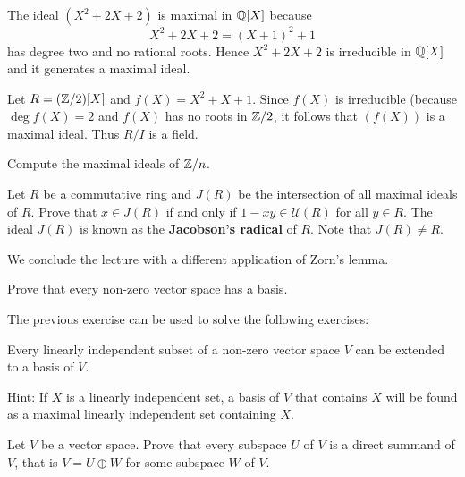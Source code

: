 \begin{example}
	The ideal $(X^2+2X+2)$ is maximal in $\mathbb{Q}[X]$ because
	\[
	X^2+2X+2=(X+1)^2+1
	\]
	has degree two and no rational roots. 
	Hence $X^2+2X+2$ is irreducible in $\mathbb{Q}[X]$ and it generates 
	a maximal ideal. 	
\end{example}


\begin{example}
	Let $R=(\mathbb{Z}/2)[X]$ and $f(X)=X^2+X+1$. Since $f(X)$ is irreducible (because $\deg f(X)=2$ and
	$f(X)$ has no roots in $\mathbb{Z}/2$, it follows that $(f(X))$ is a maximal ideal. 
	Thus $R/I$ is a field. 
\end{example}

\begin{exercise}
	Compute the maximal ideals of $\mathbb{Z}/n$. 	
\end{exercise}

\begin{exercise}
\label{xca:Jacobson}
	Let $R$ be a commutative ring and $J(R)$ be the intersection of all maximal ideals 
	of $R$. Prove that $x\in J(R)$ 
	if and only if $1-xy\in\mathcal{U}(R)$ for all $y\in R$. The ideal $J(R)$ is known
	as the \textbf{Jacobson's radical} of $R$. Note that $J(R)\ne R$.   
\end{exercise}

We conclude the lecture with a different application of Zorn's lemma.  

\begin{exercise}
	Prove that every non-zero vector space has a basis.
\end{exercise}

The previous exercise can be used to solve the following exercises:

\begin{exercise}
\label{xca:extend}
    Every linearly independent subset of a non-zero vector space
    $V$ can be extended to a basis of $V$.
\end{exercise} 

Hint: If $X$ is a linearly independent set, a basis 
of $V$ that contains $X$ will be found as a maximal linearly independent set 
containing $X$. 

\begin{exercise}
    Let $V$ be a vector space. Prove that every subspace $U$ of $V$ is a direct summand of $V$, that is
    $V=U\oplus W$ for some subspace $W$ of $V$. 
\end{exercise}

